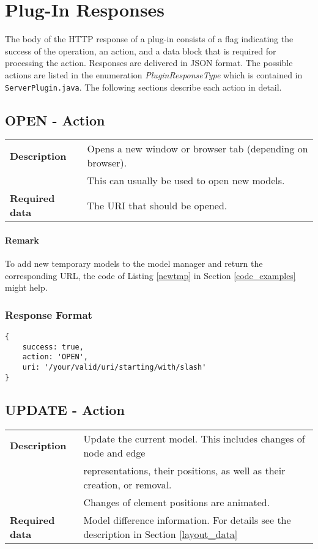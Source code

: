 \section{Plug-In Responses}
\label{response_section}

The body of the HTTP response of a plug-in consists of a flag indicating the success of the operation, an action, and a data block that is required for processing the action. Responses are delivered in JSON format. The possible actions are listed in the enumeration \textit{PluginResponseType} which is contained in \verb!ServerPlugin.java!. The following sections describe each action in detail.

\subsection{OPEN - Action}
	\begin{table}[ht]
		\centering
		\begin{tabular}{@{}ll@{}}
			\toprule
			\textbf{Description} & Opens a new window or browser tab (depending on browser). \\
			& This can usually be used to open new models. \\
			\addlinespace
			\textbf{Required data} & The URI that should be opened. \\
			\bottomrule						
		\end{tabular}
	\end{table}
	
	\paragraph{Remark} To add new temporary models to the model manager and return the corresponding URL, the code of Listing \ref{newtmp} in Section \ref{code_examples} might help.
	
	\subsubsection{Response Format}
	\begin{lstlisting}
{
	success: true,
	action: 'OPEN',
	uri: '/your/valid/uri/starting/with/slash'
}
	\end{lstlisting}
	
\subsection{UPDATE - Action}
	\begin{table}[ht]
		\centering
		\begin{tabular}{@{}ll@{}}
			\toprule
			\textbf{Description} & Update the current model. This includes changes of node and edge\\
			&representations, their positions, as
			well as their creation, or removal.\\
			&Changes of element positions are animated. \\
			\addlinespace
			\textbf{Required data} & Model difference information. For details see the description in Section \ref{layout_data}\\
			\bottomrule						
		\end{tabular}
	\end{table}
	
